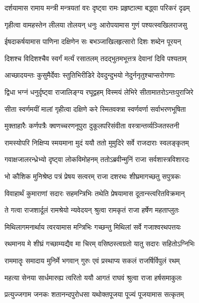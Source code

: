 \twolineshloka
{दर्शयामास रामाय मन्त्री मन्त्रयतां वरः}
{दृष्ट्वा रामः प्रहृष्टात्मा बद्ध्वा परिकरं दृढम्} %

\twolineshloka
{गृहीत्वा वामहस्तेन लीलया तोलयन् धनुः}
{आरोपयामास गुणं पश्यत्स्वखिलराजसु} %

\twolineshloka
{ईषदाकर्षयामास पाणिना दक्षिणेन सः}
{बभञ्जाखिलहृत्सारो दिशः शब्देन पूरयन्} %

\twolineshloka
{दिशश्च विदिशश्चैव स्वर्गं मर्त्यं रसातलम्}
{तदद्भुतमभूत्तत्र देवानां दिवि पश्यताम्} %

\twolineshloka
{आच्छादयन्तः कुसुमैर्देवाः स्तुतिभिरीडिरे}
{देवदुन्दुभयो नेदुर्ननृतुश्चाप्सरोगणाः} %

\twolineshloka
{द्विधा भग्नं धनुर्दृष्ट्वा राजालिङ्ग्य रघूद्वहम्}
{विस्मयं लेभिरे सीतामातरोऽन्तःपुराजिरे} %

\twolineshloka
{सीता स्वर्णमयीं मालां गृहीत्वा दक्षिणे करे}
{स्मितवक्त्रा स्वर्णवर्णा सर्वाभरणभूषिता} %

\twolineshloka
{मुक्ताहारैः कर्णपत्रैः क्वणच्चरणनूपुरा}
{दुकूलपरिसंवीता वस्त्रान्तर्व्यञ्जितस्तनी} %

\twolineshloka
{रामस्योपरि निक्षिप्य स्मयमाना मुदं ययौ}
{ततो मुमुदिरे सर्वे राजदाराः स्वलङ्कृतम्} %

\twolineshloka
{गवाक्षजालरन्ध्रेभ्यो दृष्ट्वा लोकविमोहनम्}
{ततोऽब्रवीन्मुनिं राजा सर्वशास्त्रविशारदः} %

\twolineshloka
{भो कौशिक मुनिश्रेष्ठ पत्रं प्रेषय सत्वरम्}
{राजा दशरथः शीघ्रमागच्छतु सपुत्रकः} %

\twolineshloka
{विवाहार्थं कुमाराणां सदारः सहमन्त्रिभिः}
{तथेति प्रेषयामास दूतान्स्त्वरितविक्रमान्} %

\twolineshloka
{ते गत्वा राजशार्दूलं रामश्रेयो न्यवेदयन्}
{श्रुत्वा रामकृतं राजा हर्षेण महताप्लुतः} %

\twolineshloka
{मिथिलागमनार्थाय त्वरयामास मन्त्रिभिः}
{गच्छन्तु मिथिलां सर्वे गजाश्वरथपत्तयः} %

\twolineshloka
{रथमानय मे शीघ्रं गच्छाम्यद्यैव मा चिरम्}
{वसिष्ठस्त्वग्रतो यातु सदारः सहितोऽग्निभिः} %

\twolineshloka
{राममातॄः समादाय मुनिर्मे भगवान् गुरुः}
{एवं प्रस्थाप्य सकलं राजर्षिर्विपुलं रथम्} %

\twolineshloka
{महत्या सेनया सार्धमारुह्य त्वरितो ययौ}
{आगतं राघवं श्रुत्वा राजा हर्षसमाकुलः} %

\twolineshloka
{प्रत्युज्जगाम जनकः शतानन्दपुरोधसा}
{यथोक्तपूजया पूज्यं पूजयामास सत्कृतम्} %

